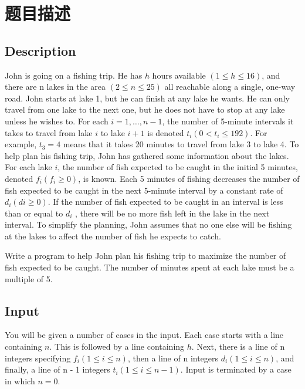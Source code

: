 \documentclass{report}
\begin{document}
\section{题目描述}
\label{sec:ti_mu_miao_shu_6}

\subsection{Description}
John is going on a fishing trip. He has $h$ hours available $(1 \leq h \leq 16)$, and there are n lakes in the area $(2 \leq n \leq 25)$ all reachable along a single, one-way road. John starts at lake 1, but he can finish at any lake he wants. He can only travel from one lake to the next one, but he does not have to stop at any lake unless he wishes to. For each $i = 1, \ldots, n - 1$, the number of 5-minute intervals it takes to travel from lake $i$ to lake $i + 1$ is denoted $t_i (0 < t_i \leq 192)$. For example, $t_3 = 4$ means that it takes 20 minutes to travel from lake 3 to lake 4. To help plan his fishing trip, John has gathered some information about the lakes. For each lake $i$, the number of fish expected to be caught in the initial 5 minutes, denoted $f_i (f_i \geq 0)$, is known. Each 5 minutes of fishing decreases the number of fish expected to be caught in the next 5-minute interval by a constant rate of $d_i (di \geq 0)$. If the number of fish expected to be caught in an interval is less than or equal to $d_i$ , there will be no more fish left in the lake in the next interval. To simplify the planning, John assumes that no one else will be fishing at the lakes to affect the number of fish he expects to catch. \par

Write a program to help John plan his fishing trip to maximize the number of fish expected to be caught. The number of minutes spent at each lake must be a multiple of 5. \par

\subsection{Input}
You will be given a number of cases in the input. Each case starts with a line containing $n$. This is followed by a line containing $h$. Next, there is a line of n integers specifying $f_i (1 \leq i \leq n)$, then a line of n integers $d_i (1 \leq i \leq n)$, and finally, a line of n - 1 integers $t_i (1 \leq i \leq n - 1)$. Input is terminated by a case in which $n = 0$.\par
\end{document}
